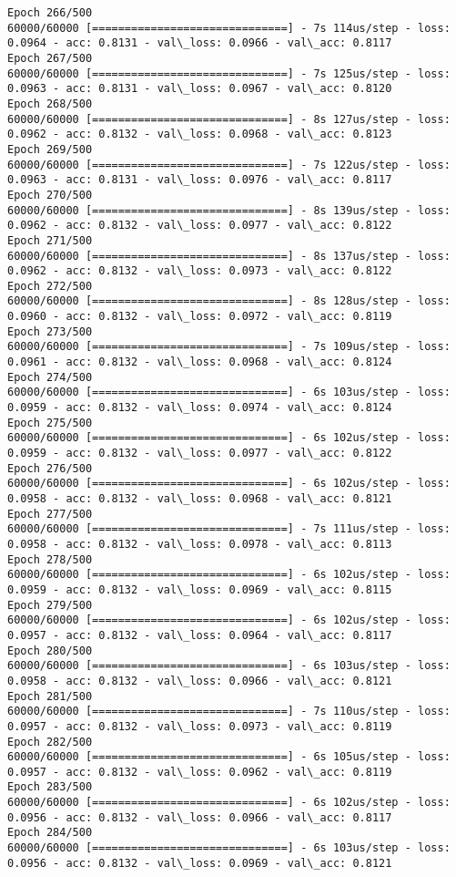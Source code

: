 \documentclass[11pt]{article}
\begin{document}
\begin{Verbatim}[commandchars=\\\{\}]
Epoch 266/500
60000/60000 [==============================] - 7s 114us/step - loss: 0.0964 - acc: 0.8131 - val\_loss: 0.0966 - val\_acc: 0.8117
Epoch 267/500
60000/60000 [==============================] - 7s 125us/step - loss: 0.0963 - acc: 0.8131 - val\_loss: 0.0967 - val\_acc: 0.8120
Epoch 268/500
60000/60000 [==============================] - 8s 127us/step - loss: 0.0962 - acc: 0.8132 - val\_loss: 0.0968 - val\_acc: 0.8123
Epoch 269/500
60000/60000 [==============================] - 7s 122us/step - loss: 0.0963 - acc: 0.8131 - val\_loss: 0.0976 - val\_acc: 0.8117
Epoch 270/500
60000/60000 [==============================] - 8s 139us/step - loss: 0.0962 - acc: 0.8132 - val\_loss: 0.0977 - val\_acc: 0.8122
Epoch 271/500
60000/60000 [==============================] - 8s 137us/step - loss: 0.0962 - acc: 0.8132 - val\_loss: 0.0973 - val\_acc: 0.8122
Epoch 272/500
60000/60000 [==============================] - 8s 128us/step - loss: 0.0960 - acc: 0.8132 - val\_loss: 0.0972 - val\_acc: 0.8119
Epoch 273/500
60000/60000 [==============================] - 7s 109us/step - loss: 0.0961 - acc: 0.8132 - val\_loss: 0.0968 - val\_acc: 0.8124
Epoch 274/500
60000/60000 [==============================] - 6s 103us/step - loss: 0.0959 - acc: 0.8132 - val\_loss: 0.0974 - val\_acc: 0.8124
Epoch 275/500
60000/60000 [==============================] - 6s 102us/step - loss: 0.0959 - acc: 0.8132 - val\_loss: 0.0977 - val\_acc: 0.8122
Epoch 276/500
60000/60000 [==============================] - 6s 102us/step - loss: 0.0958 - acc: 0.8132 - val\_loss: 0.0968 - val\_acc: 0.8121
Epoch 277/500
60000/60000 [==============================] - 7s 111us/step - loss: 0.0958 - acc: 0.8132 - val\_loss: 0.0978 - val\_acc: 0.8113
Epoch 278/500
60000/60000 [==============================] - 6s 102us/step - loss: 0.0959 - acc: 0.8132 - val\_loss: 0.0969 - val\_acc: 0.8115
Epoch 279/500
60000/60000 [==============================] - 6s 102us/step - loss: 0.0957 - acc: 0.8132 - val\_loss: 0.0964 - val\_acc: 0.8117
Epoch 280/500
60000/60000 [==============================] - 6s 103us/step - loss: 0.0958 - acc: 0.8132 - val\_loss: 0.0966 - val\_acc: 0.8121
Epoch 281/500
60000/60000 [==============================] - 7s 110us/step - loss: 0.0957 - acc: 0.8132 - val\_loss: 0.0973 - val\_acc: 0.8119
Epoch 282/500
60000/60000 [==============================] - 6s 105us/step - loss: 0.0957 - acc: 0.8132 - val\_loss: 0.0962 - val\_acc: 0.8119
Epoch 283/500
60000/60000 [==============================] - 6s 102us/step - loss: 0.0956 - acc: 0.8132 - val\_loss: 0.0966 - val\_acc: 0.8117
Epoch 284/500
60000/60000 [==============================] - 6s 103us/step - loss: 0.0956 - acc: 0.8132 - val\_loss: 0.0969 - val\_acc: 0.8121

\end{Verbatim}
\end{document}
